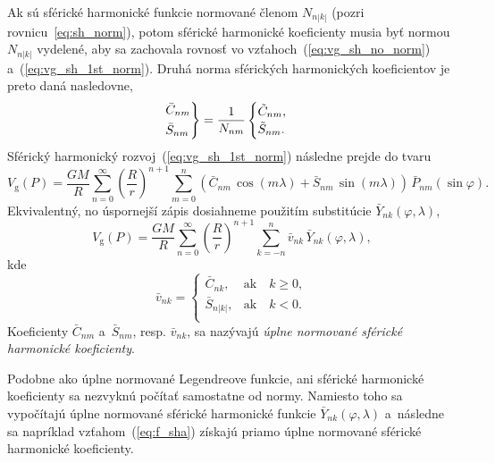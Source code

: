\documentclass[a4paper, 12pt]{book}
\newcommand{\gidx}{\mathrm g}
\begin{document}
Ak sú sférické harmonické funkcie normované členom $N_{n|k|}$ (pozri 
rovnicu~\ref{eq:sh_norm}), potom sférické harmonické koeficienty musia byť 
normou $N_{n|k|}$ vydelené, aby sa zachovala rovnosť vo 
vzťahoch~(\ref{eq:vg_sh_no_norm}) a~(\ref{eq:vg_sh_1st_norm}).  Druhá norma 
sférických harmonických koeficientov je preto daná nasledovne,
%
\begin{equation}
\label{eq:cnm_snm_2nd_norm}
\begin{rcases}
\bar{C}_{nm}\\
\bar{S}_{nm}
\end{rcases}
= \frac{1}{N_{nm}}
\begin{cases}
\tilde{C}_{nm}{,}\\
\tilde{S}_{nm}{.}
\end{cases}
\end{equation}
%
Sférický harmonický rozvoj~(\ref{eq:vg_sh_1st_norm}) následne prejde do tvaru
%
\begin{equation}
\label{eq:vg_sh_2nd_norm}
V_\gidx(P) = \frac{GM}{R} \sum_{n = 0}^\infty \left( \frac{R}{r} \right)^{n
+ 1} \sum_{m = 0}^{n} \left( \bar{C}_{nm} \, \cos(m\lambda) + \bar{S}_{nm} \,
\sin(m\lambda)\right) \, \bar{P}_{nm}(\sin\varphi){.}
\end{equation}
%
Ekvivalentný, no úspornejší zápis dosiahneme použitím substitúcie
$\bar{Y}_{nk}(\varphi, \lambda)$,
%
\begin{equation}
\label{eq:vg_sh_2nd_norm_ynk}
V_\gidx(P) = \frac{GM}{R} \sum_{n = 0}^\infty \left( \frac{R}{r} \right)^{n
+ 1} \sum_{k = -n}^{n} \bar{v}_{nk} \, \bar{Y}_{nk}(\varphi, \lambda){,}
\end{equation}
kde
%
\begin{equation}
\bar{v}_{nk} =
%
\begin{cases}
\bar{C}_{nk}{,}    &\text{ak} \quad k \geq 0{,}\\
\bar{S}_{n|k|}{,}  &\text{ak} \quad k < 0{.}\\
\end{cases}
\end{equation}
%
Koeficienty $\bar{C}_{nm}$ a~$\bar{S}_{nm}$, resp. $\bar{v}_{nk}$, sa nazývajú
\emph{úplne normované sférické harmonické koeficienty}.

Podobne ako úplne normované Legendreove funkcie, ani sférické
harmonické koeficienty sa nezvyknú počítať samostatne od normy.  Namiesto toho
sa vypočítajú úplne normované sférické harmonické funkcie
$\bar{Y}_{nk}(\varphi, \lambda)$ a~následne sa napríklad
vzťahom~(\ref{eq:f_sha}) získajú priamo úplne normované sférické harmonické
koeficienty.
\end{document}
